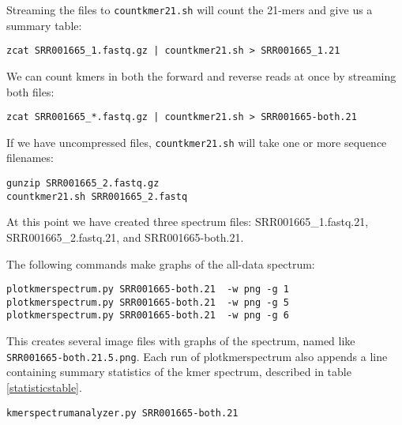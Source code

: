 \documentclass[11pt,fullpage]{article}
\begin{document}
Streaming the files to \texttt{countkmer21.sh} will count the 21-mers and give us a summary table:
\begin{verbatim}
zcat SRR001665_1.fastq.gz | countkmer21.sh > SRR001665_1.21
\end{verbatim}

We can count kmers in both the forward and reverse reads at once by streaming both files:
\begin{verbatim}
zcat SRR001665_*.fastq.gz | countkmer21.sh > SRR001665-both.21
\end{verbatim}

If we have uncompressed files, \texttt{countkmer21.sh} will take one or more sequence filenames:
\begin{verbatim}
gunzip SRR001665_2.fastq.gz
countkmer21.sh SRR001665_2.fastq 
\end{verbatim}
At this point we have created three spectrum files: SRR001665\_1.fastq.21,  SRR001665\_2.fastq.21,  and SRR001665-both.21.

The following commands make graphs of the all-data spectrum: 
\begin{verbatim}
plotkmerspectrum.py SRR001665-both.21  -w png -g 1
plotkmerspectrum.py SRR001665-both.21  -w png -g 5
plotkmerspectrum.py SRR001665-both.21  -w png -g 6
\end{verbatim}
This creates several image files with graphs of the spectrum, named like \texttt{SRR001665-both.21.5.png}.
Each run of plotkmerspectrum also appends a line containing summary statistics of the kmer spectrum,
described in table \ref{statisticstable}.

\begin{verbatim}
kmerspectrumanalyzer.py SRR001665-both.21
\end{verbatim}
\end{document}
